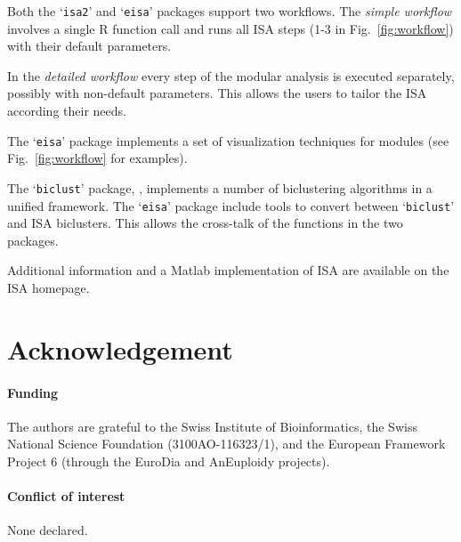\documentclass{bioinfo}
\newcommand{\Rpackage}[1]{`\texttt{#1}'}
\begin{document}
Both the \Rpackage{isa2} and \Rpackage{eisa} packages support two
workflows. The \emph{simple workflow} involves a single R function
call and runs all ISA steps (1-3 in Fig.~\ref{fig:workflow}) with
their default parameters.

In the \emph{detailed workflow} every step of the modular analysis 
is executed separately, possibly with non-default parameters. This allows
the users to tailor the ISA according their needs.


The \Rpackage{eisa} package implements a set of visualization
techniques for modules (see Fig.~\ref{fig:workflow} for examples).

The \Rpackage{biclust} package, \citep{biclust}, implements a number of
biclustering algorithms in a unified framework. The \Rpackage{eisa}
package include tools to convert between \Rpackage{biclust} and ISA
biclusters. This allows the cross-talk of the functions in the two
packages.

Additional information and a Matlab implementation of ISA are
available on the ISA homepage. 

\vspace*{-0.4cm}
\section*{Acknowledgement}

\paragraph{Funding\textcolon} The authors are grateful to the Swiss
Institute of Bioinformatics, the Swiss National Science Foundation
(3100AO-116323/1), and the European Framework Project 6 (through
the EuroDia and AnEuploidy projects).
\paragraph{Conflict of interest\textcolon} None declared.



\end{document}

